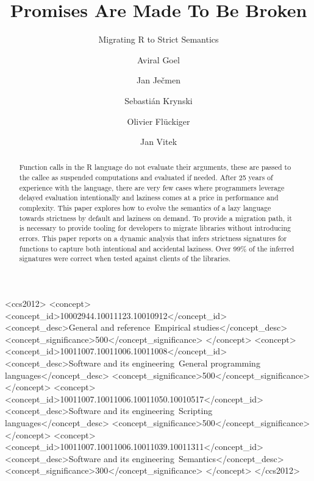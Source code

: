 \documentclass[review,creen,acmsmall]{acmart}
\begin{document}
\title{Promises Are Made To Be Broken}
\subtitle{Migrating R to Strict Semantics}

\author{Aviral Goel}
\author{Jan Ječmen}
\author{Sebastián Krynski}
\author{Olivier Flückiger}
\author{Jan Vitek}
\authorsaddresses{}
\renewcommand{\shortauthors}{Goel, et al.}

\begin{abstract}
  Function calls in the R language do not evaluate their arguments, these are
  passed to the callee as suspended computations and evaluated if needed. After
  25 years of experience with the language, there are very few cases where
  programmers leverage delayed evaluation intentionally and laziness comes at a
  price in performance and complexity. This paper explores how to evolve the
  semantics of a lazy language towards strictness by default and laziness on
  demand. To provide a migration path, it is necessary to provide tooling for
  developers to migrate libraries without introducing errors. This paper reports
  on a dynamic analysis that infers strictness signatures for functions to
  capture both intentional and accidental laziness. Over 99\% of the inferred
  signatures were correct when tested against clients of the libraries.
\end{abstract}

\begin{CCSXML}
<ccs2012>
<concept>
<concept_id>10002944.10011123.10010912</concept_id>
<concept_desc>General and reference~Empirical studies</concept_desc>
<concept_significance>500</concept_significance>
</concept>
<concept>
<concept_id>10011007.10011006.10011008</concept_id>
<concept_desc>Software and its engineering~General programming languages</concept_desc>
<concept_significance>500</concept_significance>
</concept>
<concept>
<concept_id>10011007.10011006.10011050.10010517</concept_id>
<concept_desc>Software and its engineering~Scripting languages</concept_desc>
<concept_significance>500</concept_significance>
</concept>
<concept>
<concept_id>10011007.10011006.10011039.10011311</concept_id>
<concept_desc>Software and its engineering~Semantics</concept_desc>
<concept_significance>300</concept_significance>
</concept>
</ccs2012>
\end{CCSXML}
\end{document}
